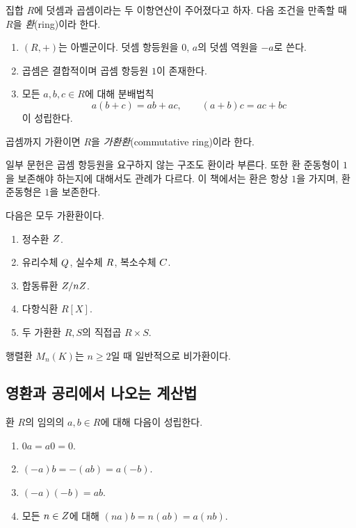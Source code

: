 \begin{definition}[환]
집합 $R$에 덧셈과 곱셈이라는 두 이항연산이 주어졌다고 하자. 다음 조건을 만족할 때 $R$을 \emph{환}(ring)이라 한다.
\begin{enumerate}[label=(R\arabic*)]
  \item $(R,+)$는 아벨군이다. 덧셈 항등원을 $0$, $a$의 덧셈 역원을 $-a$로 쓴다.
  \item 곱셈은 결합적이며 곱셈 항등원 $1$이 존재한다.
  \item 모든 $a,b,c\in R$에 대해 분배법칙
  \[
    a(b+c)=ab+ac,\qquad (a+b)c=ac+bc
  \]
  이 성립한다.
\end{enumerate}
곱셈까지 가환이면 $R$을 \emph{가환환}(commutative ring)이라 한다.
\end{definition}

\begin{remark}
일부 문헌은 곱셈 항등원을 요구하지 않는 구조도 환이라 부른다. 또한 환 준동형이 $1$을 보존해야 하는지에 대해서도 관례가 다르다. 이 책에서는 환은 항상 $1$을 가지며, 환 준동형은 $1$을 보존한다.
\end{remark}

\begin{example}[기본적인 환]
다음은 모두 가환환이다.
\begin{enumerate}[label=(\alph*)]
  \item 정수환 $Z$.
  \item 유리수체 $Q$, 실수체 $R$, 복소수체 $C$.
  \item 합동류환 $Z/nZ$.
  \item 다항식환 $R[X]$.
  \item 두 가환환 $R,S$의 직접곱 $R\times S$.
\end{enumerate}
행렬환 $M_n(K)$는 $n\ge2$일 때 일반적으로 비가환이다.
\end{example}

\subsection{영환과 공리에서 나오는 계산법}

\begin{proposition}[환의 기본 계산 규칙]
환 $R$의 임의의 $a,b\in R$에 대해 다음이 성립한다.
\begin{enumerate}[label=(\roman*)]
  \item $0a=a0=0$.
  \item $(-a)b=-(ab)=a(-b)$.
  \item $(-a)(-b)=ab$.
  \item 모든 $n\in Z$에 대해 $(na)b=n(ab)=a(nb)$.
\end{enumerate}
\end{proposition}

